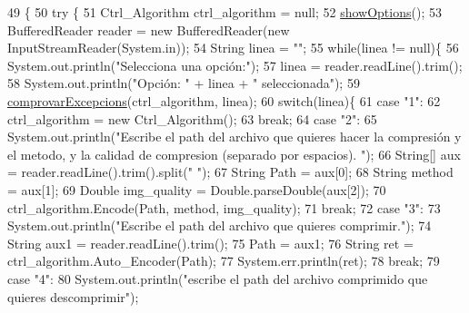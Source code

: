\begin{DoxyCode}
49                                            \{
50     \textcolor{keywordflow}{try} \{
51         Ctrl\_Algorithm ctrl\_algorithm = null;
52         \hyperlink{classdomini_1_1algorithm_1_1Driver____Ctrl__Algorithm_afad303731ad32c08c8dbffbf63b3fd9f}{showOptions}();
53         BufferedReader reader = \textcolor{keyword}{new} BufferedReader(\textcolor{keyword}{new} InputStreamReader(System.in));
54         String linea = \textcolor{stringliteral}{""};
55         \textcolor{keywordflow}{while}(linea != null)\{
56             System.out.println(\textcolor{stringliteral}{"Selecciona una opción:"});
57             linea = reader.readLine().trim();
58             System.out.println(\textcolor{stringliteral}{"Opción: "} + linea + \textcolor{stringliteral}{" seleccionada"});
59             \hyperlink{classdomini_1_1algorithm_1_1Driver____Ctrl__Algorithm_a38ad7761ecde80325d83ce2d2597a61b}{comprovarExcepcions}(ctrl\_algorithm, linea);
60             \textcolor{keywordflow}{switch}(linea)\{
61                 \textcolor{keywordflow}{case} \textcolor{stringliteral}{"1"}:
62                     ctrl\_algorithm = \textcolor{keyword}{new} Ctrl\_Algorithm();
63                 \textcolor{keywordflow}{break};
64                 \textcolor{keywordflow}{case} \textcolor{stringliteral}{"2"}:
65                     System.out.println(\textcolor{stringliteral}{"Escribe el path del archivo que quieres hacer la compresión y el
       metodo, y la calidad de compresion (separado por espacios). "});
66                     String[] aux = reader.readLine().trim().split(\textcolor{stringliteral}{" "});
67                     String Path = aux[0];
68                     String method = aux[1];
69                     Double img\_quality = Double.parseDouble(aux[2]);
70                     ctrl\_algorithm.Encode(Path, method, img\_quality);
71                 \textcolor{keywordflow}{break};
72                 \textcolor{keywordflow}{case} \textcolor{stringliteral}{"3"}:
73                     System.out.println(\textcolor{stringliteral}{"Escribe el path del archivo que quieres comprimir."});
74                     String aux1 = reader.readLine().trim();
75                     Path = aux1;
76                     String ret = ctrl\_algorithm.Auto\_Encoder(Path);
77                     System.err.println(ret);
78                 \textcolor{keywordflow}{break};
79                 \textcolor{keywordflow}{case} \textcolor{stringliteral}{"4"}:
80                     System.out.println(\textcolor{stringliteral}{"escribe el path del archivo comprimido que quieres descomprimir"});

\end{DoxyCode}
